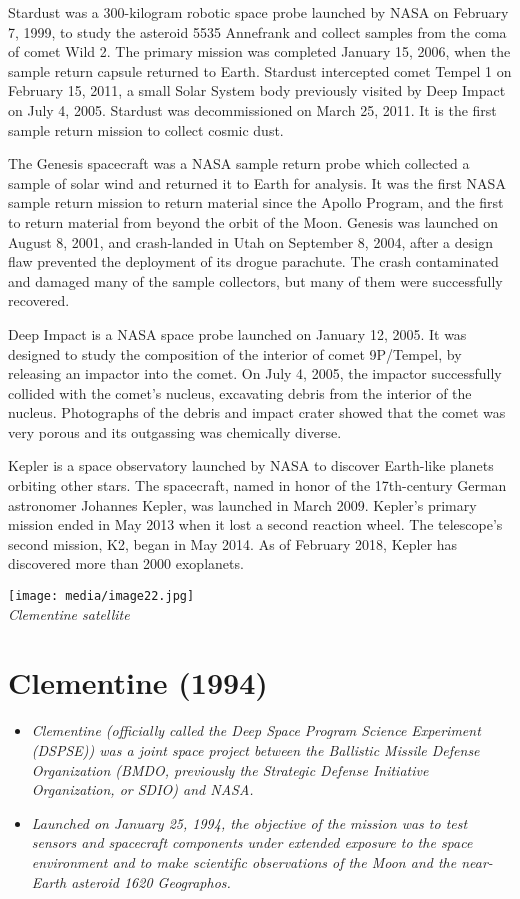 Stardust was a 300-kilogram robotic space probe launched by NASA on
February 7, 1999, to study the asteroid 5535 Annefrank and collect
samples from the coma of comet Wild 2. The primary mission was completed
January 15, 2006, when the sample return capsule returned to Earth.
Stardust intercepted comet Tempel 1 on February 15, 2011, a small Solar
System body previously visited by Deep Impact on July 4, 2005. Stardust
was decommissioned on March 25, 2011. It is the first sample return
mission to collect cosmic dust.

The Genesis spacecraft was a NASA sample return probe which collected a
sample of solar wind and returned it to Earth for analysis. It was the
first NASA sample return mission to return material since the Apollo
Program, and the first to return material from beyond the orbit of the
Moon. Genesis was launched on August 8, 2001, and crash-landed in Utah
on September 8, 2004, after a design flaw prevented the deployment of
its drogue parachute. The crash contaminated and damaged many of the
sample collectors, but many of them were successfully recovered.

Deep Impact is a NASA space probe launched on January 12, 2005. It was
designed to study the composition of the interior of comet 9P/Tempel, by
releasing an impactor into the comet. On July 4, 2005, the impactor
successfully collided with the comet's nucleus, excavating debris from
the interior of the nucleus. Photographs of the debris and impact crater
showed that the comet was very porous and its outgassing was chemically
diverse.

Kepler is a space observatory launched by NASA to discover Earth-like
planets orbiting other stars. The spacecraft, named in honor of the
17th-century German astronomer Johannes Kepler, was launched in March
2009. Kepler's primary mission ended in May 2013 when it lost a second
reaction wheel. The telescope's second mission, K2, began in May 2014.
As of February 2018, Kepler has discovered more than 2000 exoplanets.

\texttt{[image: media/image22.jpg]}\\
\emph{Clementine satellite}

\section{Clementine (1994)}\label{clementine-1994}

\begin{itemize}
\item
  \emph{Clementine (officially called the Deep Space Program Science
  Experiment (DSPSE)) was a joint space project between the Ballistic
  Missile Defense Organization (BMDO, previously the Strategic Defense
  Initiative Organization, or SDIO) and NASA.}
\item
  \emph{Launched on January 25, 1994, the objective of the mission was
  to test sensors and spacecraft components under extended exposure to
  the space environment and to make scientific observations of the Moon
  and the near-Earth asteroid 1620 Geographos.}
\end{itemize}

